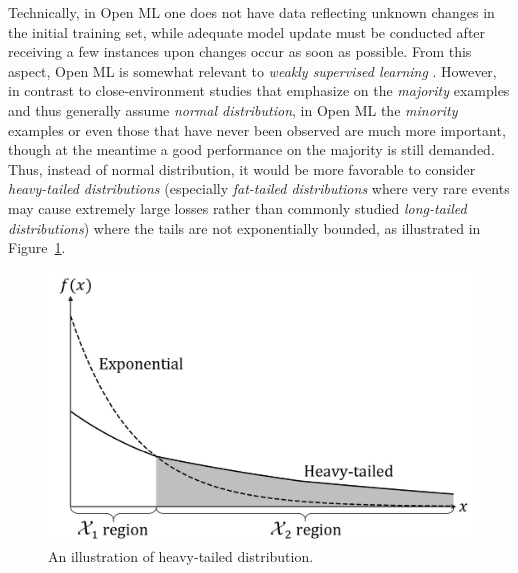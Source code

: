 \documentclass[review,11pt]{ReportTemplate}
\begin{document}
Technically, in Open ML one does not have data reflecting unknown changes in the initial training set, while adequate model update must be conducted after receiving a few instances upon changes occur as soon as possible. From this aspect, Open ML is somewhat relevant to \textit{weakly supervised learning} \cite{Zhou2018}. However, in contrast to close-environment studies that emphasize on the \textit{majority} examples and thus generally assume \textit{normal distribution}, in Open ML the \textit{minority} examples or even those that have never been observed are much more important, though at the meantime a good performance on the majority is still demanded. Thus, instead of normal distribution, it would be more favorable to consider \textit{heavy-tailed distributions} (especially \textit{fat-tailed distributions} where very rare events may cause extremely large losses rather than commonly studied \textit{long-tailed distributions}) where the tails are not exponentially bounded, as illustrated in Figure~\ref{fig:fig6}.

\begin{figure}[!ht]
\begin{center}
  \includegraphics[width=0.55\linewidth]{fig6}
  \caption{An illustration of heavy-tailed distribution.}\label{fig:fig6}
\end{center}
\end{figure}
\end{document}
